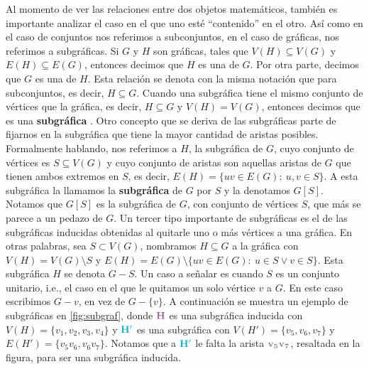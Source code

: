 Al momento de ver las relaciones entre dos objetos matem\'aticos, tambi\'en es
importante analizar el caso en el que uno est\'e ``contenido'' en el otro. As\'i
como en el caso de conjuntos nos referimos a subconjuntos, en el caso de
gr\'aficas, nos referimos a subgr\'aficas. Si $G$ y $H$ son gr\'aficas, tales
que $V(H) \subseteq V(G)$ y $E(H) \subseteq E(G)$, entonces decimos que $H$ es
una  de $G$. Por otra parte, decimos que $G$ es una
 de $H$. Esta relaci\'on se denota con la misma
notaci\'on que para subconjuntos, es decir, $H \subseteq G$. Cuando una
subgr\'afica tiene el mismo conjunto de v\'ertices que la gr\'afica, es decir,
$H \subseteq G$ y $V(H)= V(G)$, entonces decimos que es una
\textbf{subgr\'afica} . Otro concepto que se
deriva de las subgr\'aficas parte de fijarnos en la subgr\'afica que tiene la
mayor cantidad de aristas posibles. Formalmente hablando, nos referimos a $H$,
la subgr\'afica de $G$, cuyo conjunto de v\'ertices es $S \subseteq V(G)$ y cuyo
conjunto de aristas son aquellas aristas de $G$ que tienen ambos extremos en
$S$, es decir, $E(H) = \{uv \in E(G) \colon\ u,v \in S\}$. A esta subgr\'afica
la llamamos la \textbf{subgr\'afica}  de $G$
por $S$ y la denotamos $G[S]$. Notamos que $G[S]$ es la subgr\'afica de $G$, con
conjunto de v\'ertices $S$, que m\'as se parece a un pedazo de $G$. Un tercer
tipo importante de subgr\'aficas es el de las subgr\'aficas inducidas obtenidas
al quitarle uno o m\'as v\'ertices a una gr\'afica. En otras palabras, sea $S
\subset V(G)$, nombramos $H \subseteq G$ a la gr\'afica con $V(H)=V(G) \setminus
S$ y $E(H) = E(G)\setminus\{uv \in E(G) \colon\ u \in S \lor v \in S\}$. Esta
subgr\'afica $H$ se denota $G-S$. Un caso a se\~{n}alar es cuando $S$ es un
conjunto unitario, i.e., el caso en el que le quitamos un solo v\'ertice $v$ a
$G$. En este caso escribimos $G-v$, en vez de $G-\{v\}$. A continuaci\'on se
muestra un ejemplo de subgr\'aficas en \cref{fig:subgraf}, donde
${\color{morado}\bf H}$ es una subgr\'afica inducida con $V(H) =
\{v_1,v_2,v_3,v_4\}$ y ${\color{azulCielo}\bf H'}$ es una subgr\'afica con
$V(H')=\{v_5,v_6,v_7\}$ y $E(H')=\{v_5v_6,  v_6v_7\}$. Notamos que a
${\color{azulCielo}\bf H'}$ le falta la arista ${\color{grisOscuro!80}\bf
v_5v_7}$, resaltada en la figura, para ser una subgr\'afica inducida. 

